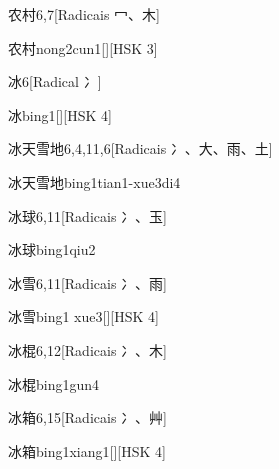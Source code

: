 \begin{entry}{农村}{6,7}[Radicais ⼍、⽊]
  \begin{phonetics}{农村}{nong2cun1}[][HSK 3]
  \end{phonetics}
\end{entry}

\begin{entry}{冰}{6}[Radical ⼎]
  \begin{phonetics}{冰}{bing1}[][HSK 4]
  \end{phonetics}
\end{entry}

\begin{entry}{冰天雪地}{6,4,11,6}[Radicais ⼎、⼤、⾬、⼟]
  \begin{phonetics}{冰天雪地}{bing1tian1-xue3di4}
  \end{phonetics}
\end{entry}

\begin{entry}{冰球}{6,11}[Radicais ⼎、⽟]
  \begin{phonetics}{冰球}{bing1qiu2}
  \end{phonetics}
\end{entry}

\begin{entry}{冰雪}{6,11}[Radicais ⼎、⾬]
  \begin{phonetics}{冰雪}{bing1 xue3}[][HSK 4]
  \end{phonetics}
\end{entry}

\begin{entry}{冰棍}{6,12}[Radicais ⼎、⽊]
  \begin{phonetics}{冰棍}{bing1gun4}
  \end{phonetics}
\end{entry}

\begin{entry}{冰箱}{6,15}[Radicais ⼎、⾋]
  \begin{phonetics}{冰箱}{bing1xiang1}[][HSK 4]
  \end{phonetics}
\end{entry}

